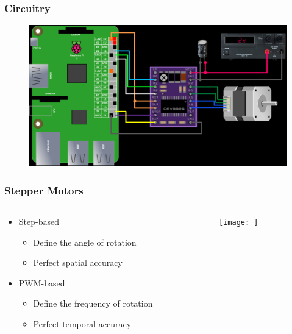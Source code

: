 \documentclass{beamer}
\begin{document}
\begin{frame}

    \frametitle{Circuitry}

        \begin{figure}
            \centering
            \includegraphics[width=\textwidth]{connections.png}
        \end{figure}

\end{frame}

\begin{frame}

    \frametitle{Stepper Motors}
    \begin{columns}
        \begin{column}{0.5\textwidth}

            \begin{itemize}
                \item Step-based
                    \begin{itemize}
                        \item Define the angle of rotation
                        \item Perfect spatial accuracy
                    \end{itemize}
                    \vspace{1em}
                \item PWM-based
                    \begin{itemize}
                        \item Define the frequency of rotation
                        \item Perfect temporal accuracy
                    \end{itemize}
            \end{itemize}
        \end{column}
        \begin{column}{0.5\textwidth}
            \begin{figure}
                \centering
                \texttt{[image: ]}
            \end{figure}
        \end{column}
    \end{columns}

                    
                            
                
\end{frame}
\end{document}

